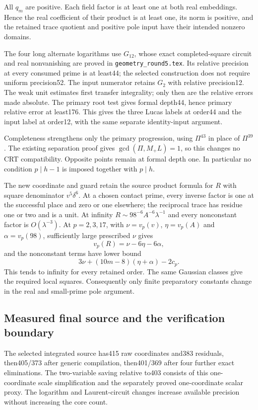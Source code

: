 All $q_m$ are positive. Each field factor is at least one at both real
embeddings. Hence the real coefficient of their product is at least one,
its norm is positive, and the retained trace quotient and positive pole
input have their intended nonzero domains.

The four long alternate logarithms use $G_{12}$, whose exact completed-square
circuit and real nonvanishing are proved in \texttt{geometry\_round5.tex}.
Its relative precision at every consumed prime is at least44; the selected
construction does not require uniform precision52. The input numerator
retains $G_2$ with relative precision12. The weak unit estimates first
transfer integrality; only then are the relative errors made absolute.
The primary root test gives formal depth44, hence primary relative error
at least176. This gives the three Lucas labels at order44 and the input
label at order12, with the same separate identity-input argument.

Completeness strengthens only the primary progression, using $\Pi^{43}$
in place of $\Pi^{39}$. The existing separation proof gives
$\gcd(\Pi,M_+L)=1$, so this changes no CRT compatibility. Opposite points
remain at formal depth one. In particular no condition $p\mid h-1$ is
imposed together with $p\mid h$.

The new coordinate and guard retain the source product formula for $R$
with square denominator $v^5\delta^6$. At a chosen contact prime, every
inverse factor is one at the successful place and zero or one elsewhere;
the reciprocal trace has residue one or two and is a unit. At infinity
$R\sim98^{-6}A^{-6}\lambda^{-1}$ and every nonconstant factor is
$O(\lambda^{-3})$. At $p=2,3,17$, with
$\nu=v_p(v)$, $\eta=v_p(A)$ and $\alpha=v_p(98)$, sufficiently large
prescribed $\nu$ gives
\[
 v_p(R)=\nu-6\eta-6\alpha,
\]
and the nonconstant terms have lower bound
\[
 3\nu+(10m-8)(\eta+\alpha)-2c_p.
\]
This tends to infinity for every retained order. The same Gaussian
classes give the required local squares. Consequently only finite
preparatory constants change in the real and small-prime pole argument.

\subsection{Measured final source and the verification boundary}

The selected integrated source has415 raw coordinates and383 residuals,
then405/373 after generic compilation, then401/369 after four further
exact eliminations. The two-variable saving relative to403 consists of
this one-coordinate scale simplification and the separately proved
one-coordinate scalar proxy. The logarithm and Laurent-circuit changes
increase available precision without increasing the core count.

